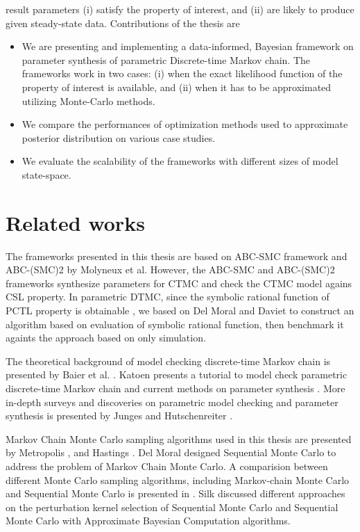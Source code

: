 result parameters (i) satisfy the property of
interest, and (ii) are likely to produce given steady-state data. Contributions of the thesis are
\begin{itemize}
      \item We are presenting and implementing a data-informed, Bayesian framework on parameter
            synthesis of parametric Discrete-time Markov chain. The frameworks work in two cases:
            (i) when the exact likelihood function of the property of interest is available, and
            (ii) when it has to be approximated utilizing Monte-Carlo methods.
      \item We compare the performances of optimization methods used to approximate posterior
            distribution on various case studies.
      \item We evaluate the scalability of the frameworks with different sizes of model state-space.
\end{itemize}

\section{Related works}
The frameworks presented in this thesis are based on ABC-SMC framework \cite{molyneux2019bayesian}
and ABC-(SMC)2 \cite{molyneux2020abc} by Molyneux et al. However, the ABC-SMC and ABC-(SMC)2
frameworks synthesize parameters for CTMC and check the CTMC model agains CSL property. In
parametric DTMC, since the symbolic rational function of PCTL property is obtainable
\cite{daws2004symbolic}, we based on Del Moral \cite{del2006sequential} and Daviet
\cite{daviet2018inference} to construct an algorithm based on evaluation of symbolic rational
function, then benchmark it againts the approach based on only simulation.

The theoretical background of model checking discrete-time Markov chain is presented by Baier et al.
\cite{baier2008principles}. Katoen \cite{katoen2016probabilistic} presents a tutorial to model check
parametric discrete-time Markov chain and current methods on parameter synthesis . More in-depth
surveys and discoveries on parametric model checking and parameter synthesis is presented by Junges
\cite{junges2020parameter} and Hutschenreiter \cite{hutschenreiter2017parametric}.

Markov Chain Monte Carlo sampling algorithms used in this thesis are presented by Metropolis
\cite{metropolis1953equation}, and Hastings \cite{hastings1970monte}. Del Moral
\cite{del2006sequential} designed Sequential Monte Carlo to address the problem of Markov Chain
Monte Carlo. A comparision between different Monte Carlo sampling algorithms, including Markov-chain
Monte Carlo and Sequential Monte Carlo is presented in \cite{daviet2018inference}. Silk
\cite{silk2012optimizing} discussed different approaches on the perturbation kernel selection of
Sequential Monte Carlo and Sequential Monte Carlo with Approximate Bayesian Computation algorithms.

